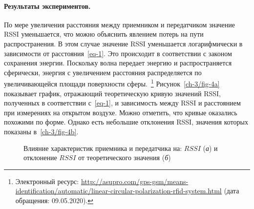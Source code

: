 \paragraph{Результаты экспериментов.}


По мере увеличения расстояния между приемником и передатчиком значение RSSI уменьшается, что можно объяснить явлением потерь на пути распространения. В этом случае значение RSSI уменьшается логарифмически в зависимости от расстояния~\cref{eq-1}. Это происходит в соответствии с законом сохранения энергии. Поскольку волна передает энергию и распространяется сферически, энергия с увеличением расстояния распределяется по увеличивающейся площади поверхности сферы.~\footnote{Электронный ресурс: {\tiny\url{http://asupro.com/gps-gsm/means-identification/automatic/linear-circular-polarization-rfid-system.html}} (дата обращения: 09.05.2020).} Рисунок~\cref{ch-3/fig-4a} показывает график, отражающий теоретическую кривую значений RSSI, полученных в соответствии с~\cref{eq-1}, и зависимость между RSSI и расстоянием при измерениях на открытом воздухе. Можно отметить, что кривые оказались похожими по форме. Однако есть небольшие отклонения RSSI, значения которых показаны в~\cref{ch-3/fig-4b}.

\begin{figure}[!htb]
	\centering
	\caption[Влияние характеристик приемника и передатчика на $RSSI$ и отклонение $RSSI$ от теоретического значения]{Влияние характеристик приемника и передатчика на: $RSSI$ (\textit{а}) и отклонение $RSSI$ от теоретического значения (\textit{б})}
\end{figure}

